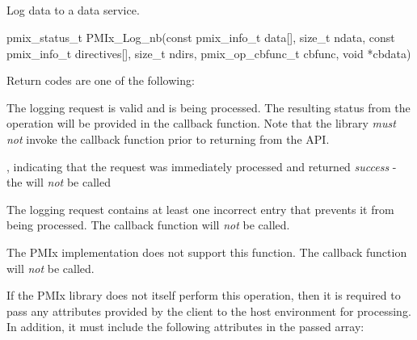 \subsection{}

\summary

Log data to a data service.

\format

\cspecificstart
\begin{codepar}
pmix_status_t
PMIx_Log_nb(const pmix_info_t data[], size_t ndata,
            const pmix_info_t directives[], size_t ndirs,
            pmix_op_cbfunc_t cbfunc, void *cbdata)
\end{codepar}
\cspecificend

\begin{arglist}
\end{arglist}

Return codes are one of the following:

\begin{constantdesc}
\item {} The logging request is valid and is being processed. The resulting status from the operation will be provided in the callback function. Note that the library \emph{must not} invoke the callback function prior to returning from the \ac{API}.
\item {}, indicating that the request was immediately processed and returned \textit{success} - the  will \textit{not} be called
\item {} The logging request contains at least one incorrect entry that prevents it from being processed. The callback function will \emph{not} be called.
\item {} The \ac{PMIx} implementation does not support this function. The callback function will \emph{not} be called.
\end{constantdesc}

\reqattrstart
If the \ac{PMIx} library does not itself perform this operation, then it is required to pass any attributes provided by the client to the host environment for processing. In addition, it must include the following attributes in the passed  array:

